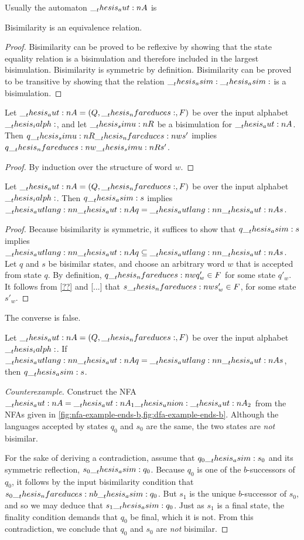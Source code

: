 Usually the automaton $\__thesis_aut:n {A}$ is 

\begin{theorem}
  Bisimilarity is an equivalence relation.
\end{theorem}
%
\begin{proof}
  Bisimilarity can be proved to be reflexive by showing that the state equality relation is a bisimulation and therefore included in the largest bisimulation.
  Bisimilarity is symmetric by definition.
  Bisimilarity can be proved to be transitive by showing that the relation $\__thesis_asim:\__thesis_asim:$ is a bisimulation.
\end{proof}

\begin{theorem}
  Let $\aut{A} = (Q, \mathord{\nfareduces}, F)$ be  over the input alphabet $\__thesis_ialph:$, and let $\__thesis_simu:n {R}$ be a bisimulation for $\__thesis_aut:n {A}$.
  Then $q \simu{R}\nfareduces[w] s'$ implies $q \nfareduces[w]\simu{R} s'$.
\end{theorem}
%
\begin{proof}
  By induction over the structure of word $w$.
\end{proof}

\begin{theorem}
  Let $\aut{A} = (Q, \mathord{\nfareduces}, F)$ be  over the input alphabet $\__thesis_ialph:$.
  Then $q \__thesis_asim: s$ implies $\__thesis_autlang:nn {\__thesis_aut:n {A}} {q} = \__thesis_autlang:nn {\__thesis_aut:n {A}} {s}$.
\end{theorem}
%
\begin{proof}
  Because bisimilarity is symmetric, it suffices to show that $q \__thesis_asim: s$ implies $\__thesis_autlang:nn {\__thesis_aut:n {A}} {q} \subseteq \__thesis_autlang:nn {\__thesis_aut:n {A}} {s}$.
  Let $q$ and $s$ be bisimilar states, and choose an arbitrary word $w$ that is accepted from state $q$.
  By definition, $q \nfareduces[w] q'_w \in F$ for some state $q'_w$.
  It follows from \cref{??} and [...] that $s \nfareduces[w] s'_w \in F$, for some state $s'_w$.
\end{proof}

The converse is false.
%
\begin{falseclaim}
  Let $\aut{A} = (Q, \mathord{\nfareduces}, F)$ be  over the input alphabet $\__thesis_ialph:$.
  If $\__thesis_autlang:nn {\__thesis_aut:n {A}} {q} = \__thesis_autlang:nn {\__thesis_aut:n {A}} {s}$, then $q \__thesis_asim: s$.
\end{falseclaim}
%
\begin{proof}[Counterexample]
  Construct the \ac{NFA} $\__thesis_aut:n {A} = \__thesis_aut:n {A}_1 \__thesis_union: \__thesis_aut:n {A}_2$ from the \acp{NFA} given in \cref{fig:nfa-example-ends-b,fig:dfa-example-ends-b}.
  Although the languages accepted by states $q_0$ and $s_0$ are the same, the two states are \emph{not} bisimilar.

  For the sake of deriving a contradiction, assume that $q_0 \__thesis_asim: s_0$ and its symmetric reflection, $s_0 \__thesis_asim: q_0$.
  Because $q_0$ is one of the $b$-successors of $q_0$, it follows by the input bisimilarity condition that $s_0 \nfareduces[b]\asim q_0$.
  But $s_1$ is the unique $b$-successor of $s_0$, and so we may deduce that $s_1 \__thesis_asim: q_0$.
  Just as $s_1$ is a final state, the finality condition demands that $q_0$ be final, which it is not.
  From this contradiction, we conclude that $q_0$ and $s_0$ are \emph{not} bisimilar. 
\end{proof}


